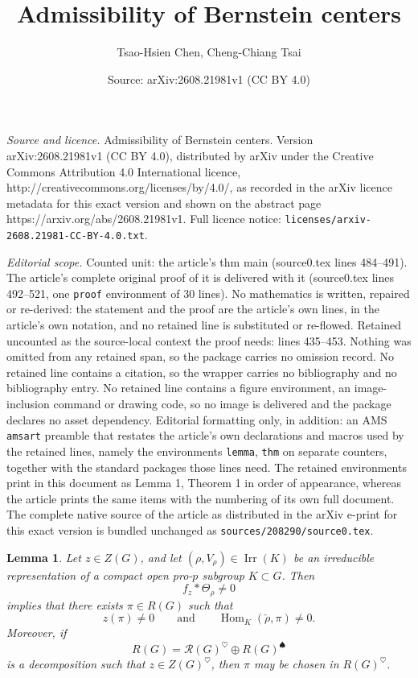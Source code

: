 \documentclass[10pt,a4paper]{amsart}
\title{Admissibility of Bernstein centers}
\author{Tsao-Hsien Chen, Cheng-Chiang Tsai}
\date{Source: arXiv:2608.21981v1 (CC BY 4.0)}
\newtheorem{lemma}{Lemma}
\newcommand{\Irr}{\operatorname{Irr}}
\begin{document}
\maketitle

\noindent\emph{Source and licence.} Admissibility of Bernstein centers. Version arXiv:2608.21981v1 (CC BY 4.0), distributed by arXiv under the Creative Commons Attribution 4.0 International licence, http://creativecommons.org/licenses/by/4.0/, as recorded in the arXiv licence metadata for this exact version and shown on the abstract page https://arxiv.org/abs/2608.21981v1. Full licence notice: \texttt{licenses/arxiv-2608.21981-CC-BY-4.0.txt}.\par\smallskip

\noindent\textit{Editorial scope.} Counted unit: the article's thm main (source0.tex lines 484--491). The article's complete original proof of it is delivered with it (source0.tex lines 492--521, one \texttt{proof} environment of 30 lines). No mathematics is written, repaired or re-derived: the statement and the proof are the article's own lines, in the article's own notation, and no retained line is substituted or re-flowed.  Retained uncounted as the source-local context the proof needs: lines 435--453.  Nothing was omitted from any retained span, so the package carries no omission record.  No retained line contains a citation, so the wrapper carries no bibliography and no bibliography entry.  No retained line contains a figure environment, an image-inclusion command or drawing code, so no image is delivered and the package declares no asset dependency.  Editorial formatting only, in addition: an AMS \texttt{amsart} preamble that restates the article's own declarations and macros used by the retained lines, namely the environments \texttt{lemma}, \texttt{thm} on separate counters, together with the standard packages those lines need.  The retained environments print in this document as Lemma 1, Theorem 1 in order of appearance, whereas the article prints the same items with the numbering of its own full document.  The complete native source of the article as distributed in the arXiv e-print for this exact version is bundled unchanged as \texttt{sources/208290/source0.tex}.
    \begin{lemma}\label{projector}
Let $z\in Z(G)$, and let $(\rho,V_\rho)\in\Irr(K)$ be an irreducible representation of a compact open pro-$p$ subgroup $K\subset G$. Then
\[
f_z*\Theta_\rho\neq 0
\]
implies that there exists $\pi\in R(G)$ such that
\[
z(\pi)\neq 0
\qquad\text{and}\qquad
\operatorname{Hom}_K(\check\rho,\pi)\neq 0.
\]
Moreover, if
\[
R(G)=\mathcal R(G)^{\heartsuit}\oplus
 R(G)^{\spadesuit}
\]
is a decomposition such that $z\in Z(G)^{\heartsuit}$, then $\pi$ may be chosen in $ R(G)^{\heartsuit}$.
\end{lemma}
\end{document}
